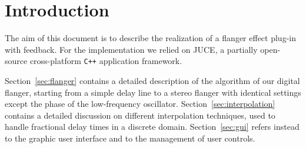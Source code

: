 \section{Introduction}

The aim of this document is to describe the realization of a flanger effect plug-in with feedback. For the implementation we relied on JUCE, a partially open-source cross-platform \texttt{C++} application framework.

Section~\ref{sec:flanger} contains a detailed description of the algorithm of our digital flanger, starting from a simple delay line to a stereo flanger with identical settings except the phase of the low-frequency oscillator.
Section~\ref{sec:interpolation} contains a detailed discussion on different interpolation techniques, used to handle fractional delay times in a discrete domain.
Section~\ref{sec:gui} refers instead to the graphic user interface and to the management of user controls.